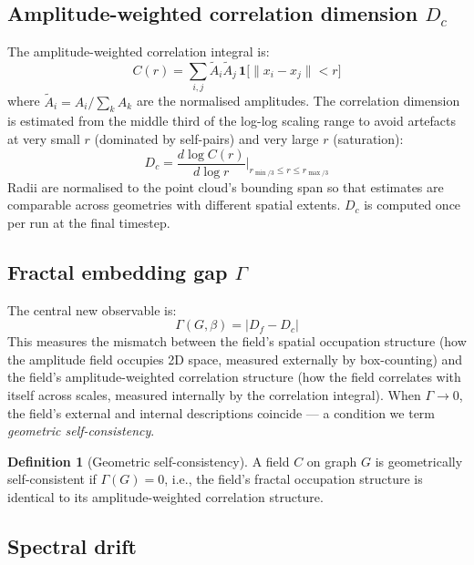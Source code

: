 \documentclass[12pt,a4paper]{article}
\theoremstyle{plain}
\theoremstyle{definition}
\newtheorem{definition}[theorem]{Definition}
\begin{document}
\subsection{Amplitude-weighted correlation dimension
            \texorpdfstring{$D_c$}{Dc}}

The amplitude-weighted correlation integral is:
\begin{equation}
C(r) = \sum_{i,j} \tilde{A}_i \tilde{A}_j\,
  \mathbf{1}\bigl[\|x_i - x_j\| < r\bigr]
\end{equation}
where $\tilde{A}_i = A_i / \sum_k A_k$ are the normalised amplitudes.
The correlation dimension is estimated from the middle third of the
log-log scaling range to avoid artefacts at very small $r$ (dominated
by self-pairs) and very large $r$ (saturation):
\begin{equation}
D_c = \frac{d\log C(r)}{d\log r}\bigg|_{r_{\min/3} \leq r \leq r_{\max/3}}
\end{equation}
Radii are normalised to the point cloud's bounding span so that estimates
are comparable across geometries with different spatial extents. $D_c$ is
computed once per run at the final timestep.

\subsection{Fractal embedding gap \texorpdfstring{$\Gamma$}{Gamma}}

The central new observable is:
\begin{equation}
\label{eq:gamma}
\Gamma(G,\beta) = |D_f - D_c|
\end{equation}
This measures the mismatch between the field's spatial occupation structure
(how the amplitude field occupies 2D space, measured externally by
box-counting) and the field's amplitude-weighted correlation structure
(how the field correlates with itself across scales, measured internally
by the correlation integral). When $\Gamma \to 0$, the field's external
and internal descriptions coincide --- a condition we term \emph{geometric
self-consistency}.

\begin{definition}[Geometric self-consistency]
A field $C$ on graph $G$ is geometrically self-consistent if
$\Gamma(G) = 0$, i.e., the field's fractal occupation structure is
identical to its amplitude-weighted correlation structure.
\end{definition}

\subsection{Spectral drift}
\end{document}
